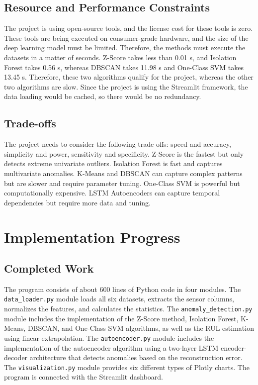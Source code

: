 \documentclass{CLS_zhou430}
\begin{document}
\section{Resource and Performance Constraints}
The project is using open-source tools, and the license cost for these tools is zero. These tools are being executed on consumer-grade hardware, and the size of the deep learning model must be limited. Therefore, the methods must execute the datasets in a matter of seconds. Z-Score takes less than 0.01 s, and Isolation Forest takes 0.56 s, whereas DBSCAN takes 11.98 s and One-Class SVM takes 13.45 s. Therefore, these two algorithms qualify for the project, whereas the other two algorithms are slow. Since the project is using the Streamlit framework, the data loading would be cached, so there would be no redundancy. 

\section{Trade-offs}
The project needs to consider the following trade-offs: speed and accuracy, simplicity and power, sensitivity and specificity. Z-Score is the fastest but only detects extreme univariate outliers. Isolation Forest is fast and captures multivariate anomalies. K-Means and DBSCAN can capture complex patterns but are slower and require parameter tuning. One-Class SVM is powerful but computationally expensive. LSTM Autoencoders can capture temporal dependencies but require more data and tuning.


\chapter{Implementation Progress}

\section{Completed Work}
The program consists of about 600 lines of Python code in four modules. The \texttt{data\_loader.py} module loads all six datasets, extracts the sensor columns, normalizes the features, and calculates the statistics. The \texttt{anomaly\_detection.py} module includes the implementation of the Z-Score method, Isolation Forest, K-Means, DBSCAN, and One-Class SVM algorithms, as well as the RUL estimation using linear extrapolation. The \texttt{autoencoder.py} module includes the implementation of the autoencoder algorithm using a two-layer LSTM encoder-decoder architecture that detects anomalies based on the reconstruction error. The \texttt{visualization.py} module provides six different types of Plotly charts. The program is connected with the Streamlit dashboard.
\end{document}
